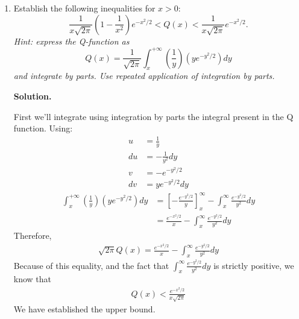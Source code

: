\documentclass[11pt]{article}
\newenvironment{solution}{\par\noindent\textbf{Solution.}\ }{\par\vspace{6pt}}
\begin{document}
    \begin{enumerate}[label=(\alph*)]

    \item Establish the following inequalities for $x > 0$:
    \[
        \frac{1}{x\sqrt{2\pi}}\left(1 - \frac{1}{x^2}\right) e^{-x^2/2} < Q(x) < \frac{1}{x\sqrt{2\pi}} e^{-x^2/2}.
    \]
    \emph{Hint: express the Q-function as}
    \[
        Q(x) = \frac{1}{\sqrt{2\pi}} \int_x^{+\infty} \left(\frac{1}{y}\right) \left(y e^{-y^2/2}\right) dy
    \]
    \emph{and integrate by parts. Use repeated application of integration by parts.}

    \begin{solution}

        First we'll integrate using integration by parts the integral present in the Q function.
        Using:
        \begin{align}
            u &= \frac{1}{y} \\
            du &= -\frac{1}{y^2}dy \\
            v &= -e^{-y^2/2} \\
            dv &= ye^{-y^2/2}dy
        \end{align}
        \begin{align}
            \int_x^{+\infty} \left(\frac{1}{y}\right) \left(y e^{-y^2/2}\right) dy &= \left[-\frac{e^{-y^2/2}}{y}\right]^{\infty}_{x} - \int_{x}^{\infty} \frac{e^{-y^2/2}}{y^2}dy \\
            &= \frac{e^{-x^2/2}}{x} - \int_{x}^{\infty} \frac{e^{-y^2/2}}{y^2}dy
        \end{align}
        Therefore,
        \begin{align}
            \sqrt{2\pi}Q(x) = \frac{e^{-x^2/2}}{x} - \int_{x}^{\infty} \frac{e^{-y^2/2}}{y^2}dy
        \end{align}
        Because of this equality, and the fact that $\int_{x}^{\infty} \frac{e^{-y^2/2}}{y^2}dy$ is strictly positive, we know that
        \begin{align}
            Q(x) < \frac{e^{-x^2/2}}{x\sqrt{2\pi}}
        \end{align}
        We have established the upper bound.


\end{solution}
\end{enumerate}
\end{document}
